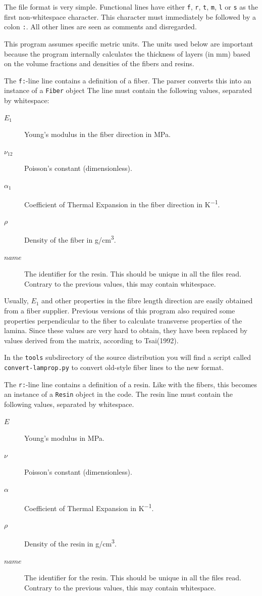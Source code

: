 \documentclass[a4paper,landscape,oneside,11pt,twocolumn]{memoir}
\begin{document}
The file format is very simple. Functional lines have either \texttt{f},
\texttt{r}, \texttt{t}, \texttt{m}, \texttt{l} or \texttt{s} as the first
non-whitespace character. This character must immediately be followed by
a colon \texttt{:}. All other lines are seen as comments and disregarded.

This program assumes specific metric units. The units used below are important
because the program internally calculates the thickness of layers (in mm)
based on the volume fractions and densities of the fibers and resins.

The \texttt{f:}-line line contains a definition of a fiber. The parser
converts this into an instance of a \texttt{Fiber} object The line must
contain the following values, separated by whitespace:
\begin{description}
    \item[$E_1$] Young's modulus in the fiber direction in \si{MPa}.
    \item[$\nu_{12}$] Poisson's constant (dimensionless).
    \item[$\alpha_1$] Coefficient of Thermal Expansion in the fiber direction
        in \si{K^{-1}}.
    \item[$\rho$] Density of the fiber in \si{g/cm^3}.
    \item[$name$] The identifier for the resin. This should be unique in all
        the files read. Contrary to the previous values, this may contain
        whitespace.
\end{description}

Usually, $E_1$ and other properties in the fibre length direction are easily
obtained from a fiber supplier. Previous versions of this program also
required some properties perpendicular to the fiber to calculate transverse
properties of the lamina. Since these values are very hard to obtain, they
have been replaced by values derived from the matrix, according to Tsai(1992).

In the \texttt{tools} subdirectory of the source distribution you will find
a script called \texttt{convert-lamprop.py} to convert old-style fiber lines
to the new format.

The \texttt{r:}-line line contains a definition of a resin. Like with the
fibers, this becomes an instance of a \texttt{Resin} object in the code. The
resin line must contain the following values, separated by whitespace.
\begin{description}
    \item[$E$] Young's modulus in \si{MPa}.
    \item[$\nu$] Poisson's constant (dimensionless).
    \item[$\alpha$] Coefficient of Thermal Expansion in \si{K^{-1}}.
    \item[$\rho$] Density of the resin in \si{g/cm^3}.
    \item[$name$] The identifier for the resin. This should be unique in all
        the files read. Contrary to the previous values, this may contain
        whitespace.
\end{description}
\end{document}
